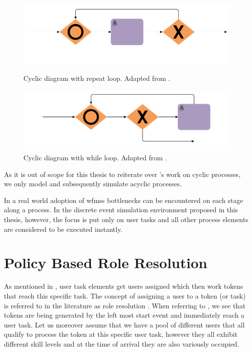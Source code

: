 \begin{figure}[!ht]
	\centering
	\begin{minipage}[b]{0.45\textwidth}
		\includegraphics[width=\textwidth]{img/repeat_loops}
		\caption{Cyclic diagram with repeat loop. Adapted from \citet[p. 12]{Soerensen2005}.}
		\label{fig:repeat_loops}
	\end{minipage}
	\hfill
	\begin{minipage}[b]{0.45\textwidth}
		\includegraphics[width=\textwidth]{img/while_loops}
		\caption{Cyclic diagram with while loop. Adapted from \citet[p. 12]{Soerensen2005}.}
		\label{fig:while_loops}
	\end{minipage}
\end{figure}

As it is out of scope for this thesis to reiterate over \citet{Soerensen2005}'s work on cyclic processes, we only model and subsequently simulate acyclic processes.

In a real world adoption of \glspl{wfms} bottlenecks can be encountered on each stage along a process. In the discrete event simulation environment proposed in this thesis, however, the focus is put only on user tasks and all other process elements are considered to be executed instantly.

\section{Policy Based Role Resolution}
\label{sec:role_resolution_theory}

As mentioned in , user task elements get users assigned which then work tokens that reach this specific task. The concept of assigning a user to a token (or task) is referred to in the literature as role resolution \citep{Zeng2005,Cheng2000}. When referring to , we see that tokens are being generated by the left most start event and immediately reach a user task. Let us moreover assume that we have a pool of different users that all qualify to process the token at this specific user task, however they all exhibit different skill levels and at the time of arrival they are also variously occupied. 

